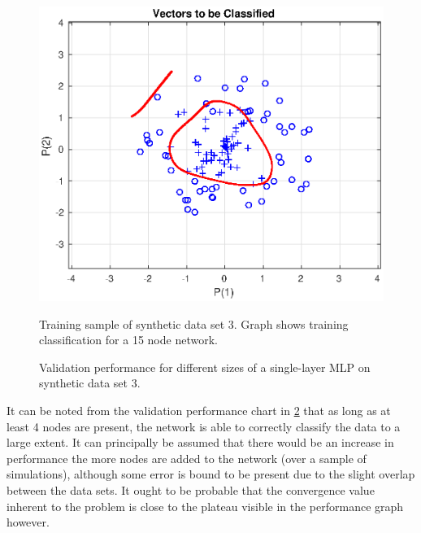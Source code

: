 \documentclass[a4paper,12pt]{article}
\theoremstyle{plain}
\theoremstyle{definition}
\begin{document}
      \begin{figure}[H]
         \centering
         \includegraphics[scale=.6]{9_15_nodes}
         \label{fig:9_data}
         \caption{Training sample of synthetic data set 3. Graph shows training classification for a 15 node
      network.}
      \end{figure}
      
      \begin{figure}[H]
         \centering
         \resizebox{.7\textwidth}{!}{}
         \caption{Validation performance for different sizes of a single-layer
         MLP on synthetic data set 3.}
         \label{fig:9}            
      \end{figure}
   
      It can be noted from the validation performance chart in \cref{fig:9} that
      as long as at least 4 nodes are present, the network is able to correctly
      classify the data to a large extent. It can principally be assumed that there would be
      an increase in performance the more nodes are added to the network (over a
      sample of simulations), although some error is bound to be present due to
      the slight overlap between the data sets. It ought to be probable that the
      convergence value inherent to the problem is close to the plateau visible
      in the performance graph however. 
\end{document}
